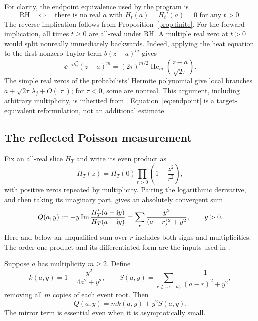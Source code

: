 For clarity, the endpoint equivalence used by the program is
\begin{equation}\label{eq:endpoint}
 \mathrm{RH}\quad\Longleftrightarrow\quad
 \text{there is no real }a\text{ with }H_t(a)=H_t'(a)=0
 \text{ for any }t>0.
\end{equation}
The reverse implication follows from Proposition~\ref{prop:finite}.
For the forward implication, all times \(t\ge0\) are all-real under RH.
A multiple real zero at \(t>0\) would split nonreally immediately
backwards. Indeed, applying the heat equation to the first nonzero
Taylor term \(b(z-a)^m\) gives
\[
 \ee^{-\tau\partial_z^2}(z-a)^m
 =(2\tau)^{m/2}
 \operatorname{He}_m\!\left(\frac{z-a}{\sqrt{2\tau}}\right).
\]
The simple real zeros of the probabilists' Hermite polynomial give local
branches \(a+\sqrt{2\tau}\,\lambda_j+O(|\tau|)\); for \(\tau<0\),
some are nonreal. This argument, including arbitrary multiplicity, is
inherited from \cite{collision,polymath}. Equation~\eqref{eq:endpoint}
is a target-equivalent reformulation, not an additional estimate.

\subsection{The reflected Poisson measurement}

Fix an all-real slice \(H_T\) and write its even product as
\[
 H_T(z)=H_T(0)\prod_{r>0}\left(1-\frac{z^2}{r^2}\right),
\]
with positive zeros repeated by multiplicity. Pairing the logarithmic
derivative, and then taking its imaginary part, gives an absolutely
convergent sum
\begin{equation}\label{eq:poisson}
 Q(a,y):=-y\operatorname{Im}\frac{H_T'(a+\mathrm i y)}{H_T(a+\mathrm i y)}
 =\sum_r\frac{y^2}{(a-r)^2+y^2},\qquad y>0.
\end{equation}
Here and below an unqualified sum over \(r\) includes both signs and
multiplicities. The order-one product and its differentiated form are
the inputs used in \cite[Section 3]{polymath}.

Suppose \(a\) has multiplicity \(m\ge2\). Define
\begin{equation}\label{eq:ks}
 k(a,y)=1+\frac{y^2}{4a^2+y^2},\qquad
 S(a,y)=\sum_{r\notin\{a,-a\}}\frac1{(a-r)^2+y^2},
\end{equation}
removing all \(m\) copies of each event root. Then
\begin{equation}\label{eq:eventmass}
 Q(a,y)=m k(a,y)+y^2S(a,y).
\end{equation}
The mirror term is essential even when it is asymptotically small.

